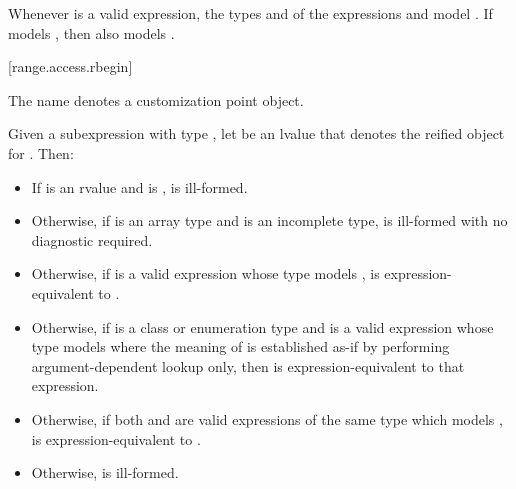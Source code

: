 \pnum
\begin{note}
Whenever  is a valid expression,
the types  and  of the expressions
 and 
model .
If  models ,
then  also models .
\end{note}

[range.access.rbegin]{}
%

\pnum
The name  denotes a customization point
object.

\pnum
Given a subexpression  with type ,
let  be an lvalue that denotes the reified object for .
Then:

\begin{itemize}
\item
  If  is an rvalue and
   is ,
   is ill-formed.

\item
  Otherwise, if  is an array type and
   is an incomplete type,
   is ill-formed with no diagnostic required.

\item
  Otherwise, if 
  is a valid expression whose type models
  ,
   is expression-equivalent to
  .

\item
  Otherwise, if  is a class or enumeration type and
  is a valid expression whose type models
  where the meaning of  is established as-if by performing
  argument-dependent lookup only,
  then  is expression-equivalent to
  that expression.

\item
  Otherwise, if both  and 
  are valid expressions of the same type which models
  ,
   is expression-equivalent to
  .

\item
  Otherwise,  is ill-formed.
\end{itemize}

